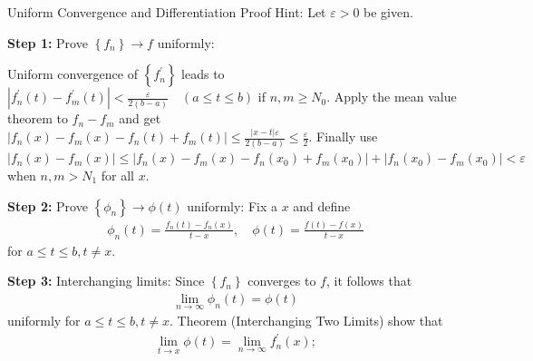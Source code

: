\documentclass[10pt,xcolor=table,dvipsnames]{beamer}
\newcommand{\tb}[1]{\textbf{#1}}
\begin{document}
\begin{frame}{Uniform Convergence and Differentiation}
\vspace{-0.3cm}
    Proof Hint: Let $\varepsilon>0$ be given.

 \tb{Step 1:} Prove $\left\{f_n\right\} \rightarrow f$ uniformly:

Uniform convergence of  $\left\{f_n^{\prime}\right\}$ leads to $\left|f_n^{\prime}(t)-f_m^{\prime}(t)\right|<\frac{\varepsilon}{2(b-a)} \quad(a \leq t \leq b)$ if $n, m \geq N_0$. 
Apply the mean value theorem to $f_n-f_m$ and get 
$\left|f_n(x)-f_m(x)-f_n(t)+f_m(t)\right| \leq \frac{|x-t| \varepsilon}{2(b-a)} \leq \frac{\varepsilon}{2}$.
Finally use 
$\left|f_n(x)-f_m(x)\right| \leq\left|f_n(x)-f_m(x)-f_n\left(x_0\right)+f_m\left(x_0\right)\right|+\left|f_n\left(x_0\right)-f_m\left(x_0\right)\right|<\varepsilon$ when $n,m>N_1$ for all $x$.

\vspace{0.3cm}
 \pause
\tb{Step 2:} Prove $\left\{\phi_n\right\} \rightarrow \phi(t)$ uniformly:
Fix a $x$ and define
\begin{align*}
\phi_n(t)=\frac{f_n(t)-f_n(x)}{t-x}, \quad \phi(t)=\frac{f(t)-f(x)}{t-x}
\end{align*}
for $a \leq t \leq b, t \neq x$.
\vspace{0.3cm}
 \pause
 
\tb{Step 3:} Interchanging  limits:
Since $\left\{f_n\right\}$ converges to $f$, it follows that
\begin{align*}
\lim _{n \rightarrow \infty} \phi_n(t)=\phi(t)
\end{align*}
uniformly for $a \leq t \leq b, t \neq x$.
Theorem (Interchanging Two Limits) show that
\begin{align*}
\lim _{t \rightarrow x} \phi(t)=\lim _{n \rightarrow \infty} f_n^{\prime}(x) ;
\end{align*}
\end{frame} 
\end{document}
